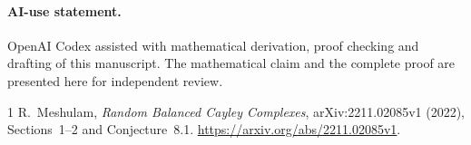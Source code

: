 \documentclass[11pt]{article}
\begin{document}
\paragraph{AI-use statement.}
OpenAI Codex assisted with mathematical derivation, proof checking and
drafting of this manuscript. The mathematical claim and the complete proof
are presented here for independent review.

\begin{thebibliography}{1}
R.~Meshulam, \emph{Random Balanced Cayley Complexes},
arXiv:2211.02085v1 (2022), Sections~1--2 and Conjecture~8.1.
\url{https://arxiv.org/abs/2211.02085v1}.
\end{thebibliography}
\end{document}
